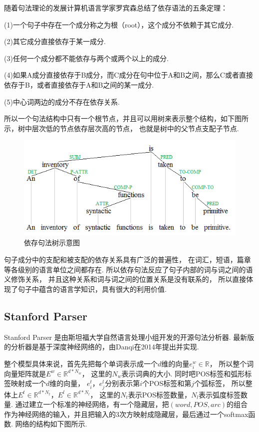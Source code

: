 \documentclass[bachelor,winfonts]{jnuthesis}
\begin{document}
随着句法理论的发展计算机语言学家罗宾森总结了依存语法的五条定理：

(1)一个句子中存在一个成分称之为根（root），这个成分不依赖于其它成分.

(2)其它成分直接依存于某一成分.

(3)任何一个成分都不能依存与两个或两个以上的成分.

(4)如果A成分直接依存于B成分，而C成分在句中位于A和B之间，那么C或者直接依存于B，或者直接依存于A和B之间的某一成分.

(5)中心词两边的成分不存在依存关系.

所以一个句法结构中只有一个根节点，并且可以用树来表示整个结构，如下图所示，树中层次低的节点依存层次高的节点，
也就是树中的父节点支配子节点.

\begin{figure}[h!]
  \centering
  \includegraphics[width=0.6\linewidth]{依存句法树.png}
  \caption{依存句法树示意图}
\end{figure}

句子成分中的支配和被支配的依存关系具有广泛的普遍性，
在词汇，短语，篇章等各级别的语言单位之间都存在.
所以依存句法反应了句子内部的词与词之间的语义修饰关系，
并且这种关系和词与词之间的位置关系是没有联系的，
所以直接体现了句子中蕴含的语言学知识，具有很大的利用价值.

\subsection{Stanford Parser}
Stanford Parser 是由斯坦福大学自然语言处理小组开发的开源句法分析器.
最新版的分析器是基于深度神经网络的，由Danqi在2014年提出并实现\cite{The}.

整个模型具体来说，首先先把每个单词表示成一个$d$维的向量$e_{i}^{w} \in \mathbb{R}$，
所以整个词向量矩阵就是$E^{w} \in \mathbb{R}^{d*N_{w}}$，
这里的$N_{w}$表示词典的大小.
同时吧POS标签和弧形标签映射成一个$d$维的向量，
$e^{t}_{i}$，$e^{l}_{j}$分别表示第$i$个POS标签和第$j$个弧标签，
所以整体上$E^{t} \in \mathbb{R}^{d*N_{t}}$，$E^{l} \in \mathbb{R}^{d*N_{l}}$，
这里的$N_{t}$表示POS标签数量，$N_{l}$表示弧度标签数量.
通过建立一个标准的神经网络，有一个隐藏层，把$(word,POS,arc)$的组合
作为神经网络的输入，并且把输入的3次方映射成隐藏层，最后通过一个softmax函数.
网络的结构如下图所示.
\end{document}
